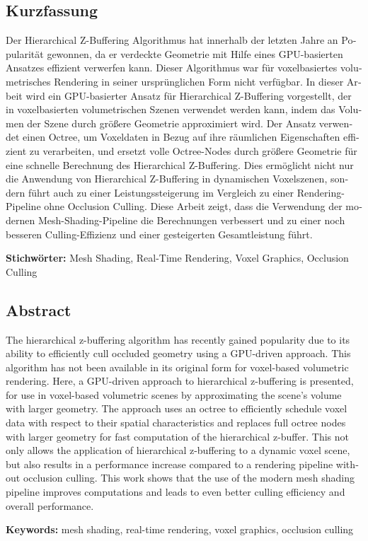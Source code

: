 \cleardoublepage

\begin{otherlanguage}{ngerman}
\chapter*{Kurzfassung}

Der Hierarchical Z-Buffering Algorithmus hat innerhalb der letzten Jahre an Popularität gewonnen, 
da er verdeckte Geometrie mit Hilfe eines GPU-basierten Ansatzes effizient verwerfen kann. Dieser 
Algorithmus war für voxelbasiertes volumetrisches Rendering in seiner ursprünglichen Form nicht 
verfügbar. In dieser Arbeit wird ein GPU-basierter Ansatz für Hierarchical Z-Buffering vorgestellt, 
der in voxelbasierten volumetrischen Szenen verwendet werden kann, indem das Volumen der Szene durch 
größere Geometrie approximiert wird. Der Ansatz verwendet einen Octree, um Voxeldaten in Bezug auf 
ihre räumlichen Eigenschaften effizient zu verarbeiten, und ersetzt volle Octree-Nodes durch größere 
Geometrie für eine schnelle Berechnung des Hierarchical Z-Buffering. Dies ermöglicht nicht nur die 
Anwendung von Hierarchical Z-Buffering in dynamischen Voxelszenen, sondern führt auch zu einer 
Leistungssteigerung im Vergleich zu einer Rendering-Pipeline ohne Occlusion Culling. Diese Arbeit 
zeigt, dass die Verwendung der modernen Mesh-Shading-Pipeline die Berechnungen verbessert und zu 
einer noch besseren Culling-Effizienz und einer gesteigerten Gesamtleistung führt.

\vfill
\noindent\textbf{Stichwörter:} Mesh Shading, Real-Time Rendering, Voxel Graphics, Occlusion Culling
\vfill
\end{otherlanguage}
\begin{otherlanguage}{english}
\chapter*{Abstract}

The hierarchical z-buffering algorithm has recently gained popularity due to its ability to 
efficiently cull occluded geometry using a GPU-driven approach. This algorithm has not been 
available in its original form for voxel-based volumetric rendering. Here, a GPU-driven 
approach to hierarchical z-buffering is presented, for use in voxel-based volumetric scenes 
by approximating the scene's volume with larger geometry. The approach uses an octree to 
efficiently schedule voxel data with respect to their spatial characteristics and replaces 
full octree nodes with larger geometry for fast computation of the hierarchical z-buffer. 
This not only allows the application of hierarchical z-buffering to a dynamic voxel scene, 
but also results in a performance increase compared to a rendering pipeline without occlusion 
culling. This work shows that the use of the modern mesh shading pipeline improves computations 
and leads to even better culling efficiency and overall performance.

\vfill
\noindent\textbf{Keywords:} mesh shading, real-time rendering, voxel graphics, occlusion culling
\vfill
\end{otherlanguage}
